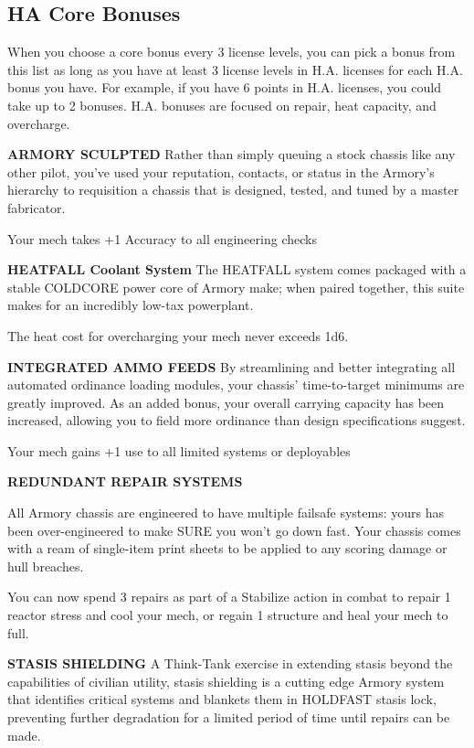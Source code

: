 \subsection{HA Core Bonuses}

When you choose a core bonus every 3 license levels, you can pick a bonus from this list as long as you have at least 3 license levels in H.A. licenses for each H.A. bonus you have. For example, if you have 6 points in H.A. licenses, you could take up to 2 bonuses. H.A. bonuses are focused on repair, heat capacity, and overcharge.


\textbf{ARMORY SCULPTED}
Rather than simply queuing a stock chassis like any other pilot, you've used your reputation, contacts, or status in the Armory's hierarchy to requisition a chassis that is designed, tested, and tuned by a master fabricator.

Your mech takes +1 Accuracy to all engineering checks

\textbf{HEATFALL Coolant System}
The HEATFALL system comes packaged with a stable COLDCORE power core of Armory make; when paired together, this suite makes for an incredibly low-tax powerplant.

The heat cost for overcharging your mech never exceeds 1d6.


\textbf{INTEGRATED AMMO FEEDS}
By streamlining and better integrating all automated ordinance loading modules, your chassis' time-to-target minimums are greatly improved. As an added bonus, your overall carrying capacity has been increased, allowing you to field more ordinance than design specifications suggest.

Your mech gains +1 use to all limited systems or deployables


\textbf{REDUNDANT REPAIR SYSTEMS}

All Armory chassis are engineered to have multiple failsafe systems: yours has been over-engineered to make SURE you won't go down fast. Your chassis comes with a ream of single-item print sheets to be applied to any scoring damage or hull breaches.

You can now spend 3 repairs as part of a Stabilize action in combat to repair 1 reactor stress and cool your mech, or regain 1 structure and heal your mech to full.


\textbf{STASIS SHIELDING}
A Think-Tank exercise in extending stasis beyond the capabilities of civilian utility, stasis shielding is a cutting edge Armory system that identifies critical systems and blankets them in HOLDFAST stasis lock, preventing further degradation for a limited period of time until repairs can be made.

